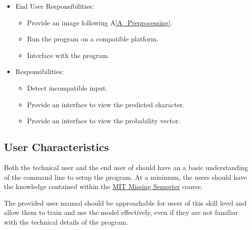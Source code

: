 \documentclass[12pt]{article}
\begin{document}
\begin{itemize}
\item End User Responsibilities:
\begin{itemize}
\item Provide an image following A\ref{A_Preprocessing}.
\item Run the program on a compatible platform.
\item Interface with the program.
\end{itemize}
\item \progname{} Responsibilities:
\begin{itemize}
\item Detect incompatible input.
\item Provide an interface to view the predicted character.
\item Provide an interface to view the probability vector.
\end{itemize}
\end{itemize}


\subsection{User Characteristics} \label{SecUserCharacteristics}

Both the technical user and the end user of \progname{} should have an a basic
understanding of the command line to setup the program. At a minimum, the users
should have the knowledge contained within the \href{https://missing.csail.mit.edu/}{MIT Missing Semester} course.

The provided user manual should be approachable for users of this skill level
and allow them to train and use the model effectively, even if they are not
familiar with the technical details of the program.

\end{document}
